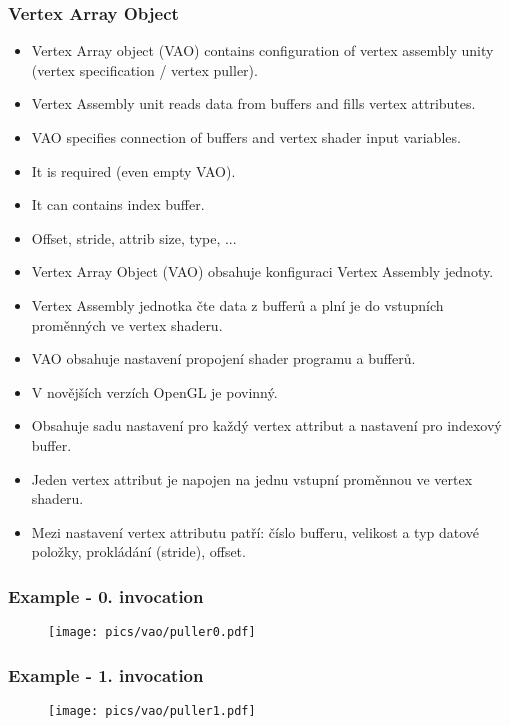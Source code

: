 
\begin{frame}\frametitle{Vertex Array Object}
\scriptsize
\begin{itemize}
  \item Vertex Array object (VAO) contains configuration of vertex assembly unity (vertex specification / vertex puller).
  \item Vertex Assembly unit reads data from buffers and fills vertex attributes.
  \item VAO specifies connection of buffers and vertex shader input variables.
  \item It is required (even empty VAO).
  \item It can contains index buffer.
  \item Offset, stride, attrib size, type, ...
\end{itemize}

\begin{itemize}
  \item Vertex Array Object (VAO) obsahuje konfiguraci Vertex Assembly jednoty.
  \item Vertex Assembly jednotka čte data z bufferů a plní je do vstupních proměnných ve vertex shaderu.
  \item VAO obsahuje nastavení propojení shader programu a bufferů.
  \item V novějších verzích OpenGL je povinný.
  \item Obsahuje sadu nastavení pro každý vertex attribut a nastavení pro indexový buffer.
  \item Jeden vertex attribut je napojen na jednu vstupní proměnnou ve vertex shaderu.
  \item Mezi nastavení vertex attributu patří: číslo bufferu, velikost a typ datové položky, prokládání (stride), offset.
\end{itemize}
\end{frame}

\begin{frame}
\frametitle{Example - 0. invocation}
  \begin{figure}[h]
  \texttt{[image: pics/vao/puller0.pdf]}
  \end{figure}
\end{frame}

\begin{frame}
\frametitle{Example - 1. invocation}
  \begin{figure}[h]
  \texttt{[image: pics/vao/puller1.pdf]}
  \end{figure}
\end{frame}

